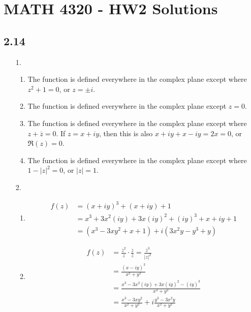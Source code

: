 \documentclass[a4paper,12pt]{article}
\begin{document}
\section*{MATH 4320 - HW2 Solutions}
\subsection*{2.14}
\begin{enumerate}
    \item[1.]
        \begin{enumerate}
            \item
                The function is defined everywhere in the complex plane except where $z^2 + 1 = 0$, or $z = \pm i$.

            \item
                The function is defined everywhere in the complex plane except $z = 0$.

            \item
                The function is defined everywhere in the complex plane except where $z + \overline{z} = 0$. If $z = x + iy$, then this is also $x + iy + x - iy = 2x = 0$, or $\Re(z) = 0$.

            \item
                The function is defined everywhere in the complex plane except where $1 - |z|^2 = 0$, or $|z| = 1$.
        \end{enumerate}

    \item[2.]
        \begin{enumerate}
            \item
                \begin{align*}
                    f(z) &= (x + iy)^3 + (x + iy) + 1 \\
                    &= x^3 + 3x^2(iy) + 3x(iy)^2 + (iy)^3 + x + iy + 1 \\
                    &= (x^3 - 3xy^2 + x + 1) + i(3x^2y - y^3 + y)
                \end{align*}

            \item
                \begin{align*}
                    f(z) &= \frac{\overline{z}^2}{z} \cdot \frac{\overline{z}}{\overline{z}} = \frac{\overline{z}^3}{|z|^2} \\
                    &= \frac{(x - iy)^3}{x^2 + y^2} \\
                    &= \frac{x^3 - 3x^2(iy) + 3x(iy)^2 - (iy)^3}{x^2 + y^2} \\
                    &= \frac{x^3 - 3xy^2}{x^2 + y^2} + i \frac{y^3 - 3x^2y}{x^2 + y^2}
                \end{align*}
        \end{enumerate}


\end{enumerate}
\end{document}
